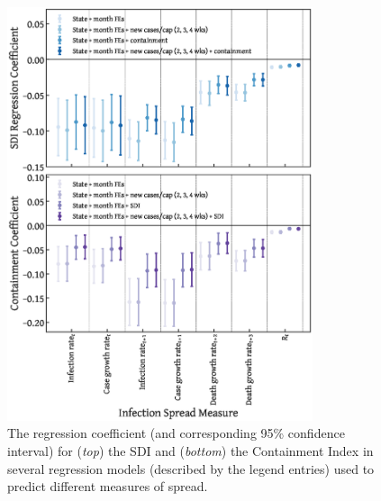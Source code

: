 \documentclass[dvipsnames]{article}
\begin{document}
\begin{figure}
    \centering
    \includegraphics[width=0.8\textwidth]{sdi_containment_coefficients.eps}
    \caption{The regression coefficient (and corresponding 95\% confidence interval) for ({\it top}) the SDI and ({\it bottom}) the Containment Index in several regression models (described by the legend entries) used to predict different measures of spread.}
    \label{fig:sdi_containment_coefficients}
\end{figure}
\end{document}
